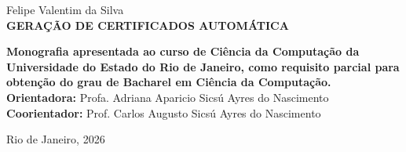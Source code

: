 \begin{center}
    {\large Felipe Valentim da Silva\\}
    \vspace{8cm}
    {\Large \textsc\textbf{{GERAÇÃO DE CERTIFICADOS AUTOMÁTICA}} \\}
    \vspace{1cm}
    \hspace{.45\linewidth}
    \begin{minipage}{.50\linewidth}
            \textbf{Monografia apresentada ao curso de Ciência da Computação da Universidade do Estado do Rio de Janeiro, como requisito parcial para obtenção do grau de Bacharel em Ciência da Computação.} \\
            
            \textbf{Orientadora:} Profa. Adriana Aparicio Sicsú Ayres do Nascimento\\
            \textbf{Coorientador:} Prof. Carlos Augusto Sicsú Ayres do Nascimento
    \end{minipage}

    \vspace{2cm}
    \vfill
    {\large Rio de Janeiro, 2026}
\end{center}
